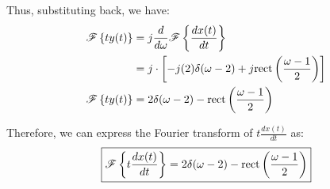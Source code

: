 \documentclass[a4paper, 10pt]{article}
\begin{document}
\begin{tosubmit}
Thus, substituting back, we have:
\begin{align*}  
    \mathscr{F} \left\{ ty(t) \right\} &= j \frac{d}{d\omega} \mathscr{F} \left\{ \frac{d x(t)}{dt} \right\} \\
    &= j \cdot \left[ - j(2) \delta(\omega - 2) + j \textrm{rect} \left( \frac{\omega - 1}{2} \right) \right] \\
    \mathscr{F} \left\{ ty(t) \right\} &= 2\delta(\omega - 2) - \textrm{rect} \left( \frac{\omega - 1}{2} \right)
\end{align*}

Therefore, we can express the Fourier transform of \( t \frac{d x(t)}{dt} \) as:
\[ \boxed{
    \mathscr{F} \left\{ t \frac{d x(t)}{dt} \right\} = 2\delta(\omega - 2) - \textrm{rect} \left( \frac{\omega - 1}{2} \right)
} \]
\end{tosubmit}

\newpage
\end{document}
